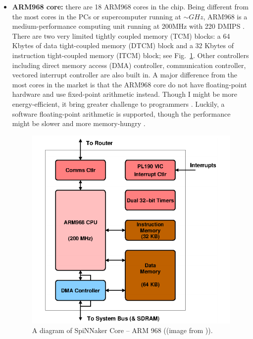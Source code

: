 \begin{itemize}
    \item \textbf{ARM968 core:} there are 18 ARM968 cores in the chip. Being different from the most cores in the PCs or supercomputer running at $\sim GHz$, ARM968 is a medium-performance computing unit running at 200MHz with 220 DMIPS \cite{furber2012overview}. There are two very limited tightly coupled memory (TCM) blocks: a 64 Kbytes of data tight-coupled memory (DTCM) block and a 32 Kbytes of instruction tight-coupled memory (ITCM) block; see Fig.~\ref{fig:arm_968}. Other controllers including direct memory access (DMA) controller, communication controller, vectored interrupt controller are also built in. A major difference from the most cores in the market is that the ARM968 core do not have floating-point hardware and use fixed-point arithmetic instead. Though I might be more energy-efficient, it bring greater challenge to programmers \cite{furber2012overview}. Luckily, a software floating-point arithmetic is supported, though the performance might be slower and more memory-hungry \cite{spin-chip-resources}.
    \begin{figure}[!tb]
   \centering
       \includegraphics[width=1\textwidth]{figures/core.png}
       \caption{A diagram of SpiNNaker Core -- ARM 968 ((image from \cite{spin-chip-resources})).}
       \label{fig:arm_968}
    \end{figure}
    

\end{itemize}
